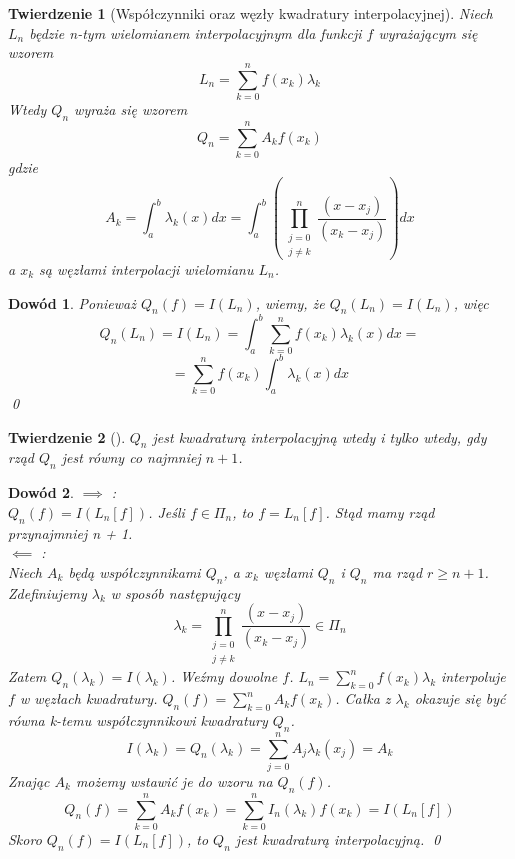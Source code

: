 \documentclass{article}
\newtheorem{twr}{Twierdzenie}
\newtheorem*{dd}{Dowód}
\begin{document}
\begin{twr}[Współczynniki oraz węzły kwadratury interpolacyjnej]
	Niech $L_n$ będzie n-tym wielomianem interpolacyjnym dla funkcji $f$ wyrażającym się wzorem
	\begin{equation*}
		L_n = \sum_{k = 0}^n f(x_k) \lambda_k
	\end{equation*}
	Wtedy $Q_n$ wyraża się wzorem
	\begin{equation*}
		Q_n = \sum_{k = 0}^n A_k f(x_k)
	\end{equation*}
	gdzie
	\begin{equation*}
		A_k = \int_a^b \lambda_k(x) dx = \int_a^b \left ( \prod_{\substack{j = 0 \\ j \neq k}}^n \frac{(x - x_j)}{(x_k - x_j)} \right ) dx
	\end{equation*}
	a $x_k$ są węzłami interpolacji wielomianu $L_n$.
\end{twr}
\begin{dd}
	\normalfont
	Ponieważ $Q_n(f) = I(L_n)$, wiemy, że $Q_n(L_n) = I(L_n)$, więc
	\begin{equation*}
		Q_n(L_n) = I(L_n) = \int_a^b  \sum_{k = 0}^n f(x_k) \lambda_k(x)  dx =
	\end{equation*}
	\begin{equation*}
		= \sum_{k = 0}^n f(x_k) \int_a^b \lambda_k(x) dx
	\end{equation*}
	\qed
\end{dd}

\begin{twr}[]
	$Q_n$ jest kwadraturą interpolacyjną wtedy i tylko wtedy, gdy rząd $Q_n$ jest równy co najmniej $n + 1$.
\end{twr}
\begin{dd}
	\normalfont
	$\implies$ :\\
	$Q_n(f) = I(L_n[f])$. Jeśli $f \in \Pi_n$, to $f = L_n[f]$. Stąd mamy rząd przynajmniej n + 1. \\
	$\impliedby$ :\\
	Niech $A_k$ będą współczynnikami $Q_n$, a $x_k$ węzłami $Q_n$ i $Q_n$ ma rząd $r \geq n + 1$. Zdefiniujemy $\lambda_k$ w sposób następujący
	\begin{equation*}
		\lambda_k = \prod_{\substack{j = 0 \\ j \neq k}}^n \frac{(x - x_j)}{(x_k - x_j)} \in \Pi_n
	\end{equation*}
	Zatem $Q_n(\lambda_k) = I(\lambda_k)$.
	Weźmy dowolne $f$. $L_n = \sum_{k = 0}^n f(x_k) \lambda_k$ interpoluje $f$ w węzłach kwadratury.
	$Q_n(f) = \sum_{k = 0}^n A_k f(x_k)$. Całka z $\lambda_k$ okazuje się być równa k-temu współczynnikowi kwadratury $Q_n$.
	\begin{equation*}
		I(\lambda_k) = Q_n(\lambda_k) = \sum_{j = 0}^n A_j \lambda_k(x_j) = A_k
	\end{equation*}
	Znając $A_k$ możemy wstawić je do wzoru na $Q_n(f)$.
	\begin{equation*}
		Q_n(f) = \sum_{k = 0}^n A_k f(x_k) = \sum_{k = 0}^n I_n(\lambda_k) f(x_k) = I(L_n[f])
	\end{equation*}
	Skoro $Q_n(f) = I(L_n[f])$, to $Q_n$ jest kwadraturą interpolacyjną.
	\qed
\end{dd}
\end{document}
